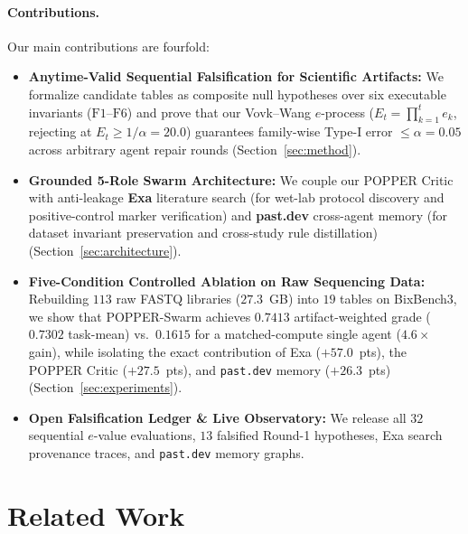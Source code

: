 \documentclass[10pt,twocolumn]{article}
\begin{document}
\paragraph{Contributions.} Our main contributions are fourfold:
\begin{itemize}[leftmargin=14pt,itemsep=2pt]
    \item \textbf{Anytime-Valid Sequential Falsification for Scientific Artifacts:} We formalize candidate tables as composite null hypotheses over six executable invariants ($\text{F1}$--$\text{F6}$) and prove that our Vovk--Wang $e$-process ($E_t = \prod_{k=1}^t e_k$, rejecting at $E_t \ge 1/\alpha = 20.0$) guarantees family-wise Type-I error $\le \alpha = 0.05$ across arbitrary agent repair rounds (Section~\ref{sec:method}).
    \item \textbf{Grounded 5-Role Swarm Architecture:} We couple our POPPER Critic with anti-leakage \textbf{Exa} literature search (for wet-lab protocol discovery and positive-control marker verification) and \textbf{past.dev} cross-agent memory (for dataset invariant preservation and cross-study rule distillation) (Section~\ref{sec:architecture}).
    \item \textbf{Five-Condition Controlled Ablation on Raw Sequencing Data:} Rebuilding $113$ raw FASTQ libraries ($27.3$~GB) into $19$ tables on BixBench3, we show that POPPER-Swarm achieves $\mathbf{0.7413}$ artifact-weighted grade ($0.7302$ task-mean) vs.\ $0.1615$ for a matched-compute single agent ($\mathbf{4.6\times}$ gain), while isolating the exact contribution of Exa ($+57.0$~pts), the POPPER Critic ($+27.5$~pts), and \texttt{past.dev} memory ($+26.3$~pts) (Section~\ref{sec:experiments}).
    \item \textbf{Open Falsification Ledger & Live Observatory:} We release all $32$ sequential $e$-value evaluations, $13$ falsified Round-1 hypotheses, Exa search provenance traces, and \texttt{past.dev} memory graphs.
\end{itemize}

\section{Related Work}
\end{document}
